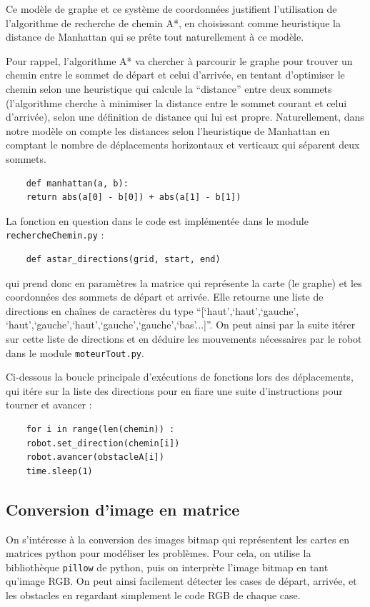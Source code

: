 \documentclass[a4paper,12pt]{report}  %
\begin{document}
Ce modèle de graphe et ce système de coordonnées justifient l’utilisation de l’algorithme de recherche de chemin A*, en choisissant comme heuristique la distance de Manhattan qui se prête tout naturellement à ce modèle.

Pour rappel, l’algorithme A* va chercher à parcourir le graphe pour trouver un chemin entre le sommet de départ et celui d’arrivée, en tentant d’optimiser le chemin selon une heuristique qui calcule la “distance” entre deux sommets (l’algorithme cherche à minimiser la distance entre le sommet courant et celui d’arrivée), selon une définition de distance qui lui est propre. Naturellement, dans notre modèle on compte les distances selon l’heuristique de Manhattan en comptant le nombre de déplacements horizontaux et verticaux qui séparent deux sommets.

\begin{lstlisting}
	def manhattan(a, b):
	return abs(a[0] - b[0]) + abs(a[1] - b[1])
\end{lstlisting}


La fonction en question dans le code est implémentée dans le module \texttt{rechercheChemin.py} : 
\begin{lstlisting}
	def astar_directions(grid, start, end)
\end{lstlisting}

qui prend donc en paramètres la matrice qui représente la carte (le graphe) et les coordonnées des sommets de départ et arrivée. Elle retourne une liste de directions en chaînes de caractères du type “[‘haut’,‘haut’,‘gauche’, ‘haut’,‘gauche’,‘haut’,‘gauche’,‘gauche’,‘bas’...]”. On peut ainsi par la suite itérer sur cette liste de directions et en déduire les mouvements nécessaires par le robot dans le module \texttt{moteurTout.py}.

Ci-dessous la boucle principale d’exécutions de fonctions lors des déplacements, qui itére sur la liste des directions pour en fiare une suite d’instructions pour tourner et avancer :
\begin{lstlisting}
	for i in range(len(chemin)) :
	robot.set_direction(chemin[i])
	robot.avancer(obstacleA[i])
	time.sleep(1)
\end{lstlisting}

\subsection{Conversion d’image en matrice}
On s'intéresse à la conversion des images bitmap qui représentent les cartes en matrices python pour modéliser les problèmes. Pour cela, on utilise la bibliothèque \texttt{pillow} de python, puis on interprète l’image bitmap en tant qu’image RGB. On peut ainsi facilement détecter les cases de départ, arrivée, et les obstacles en regardant simplement le code RGB de chaque case.
\end{document}
